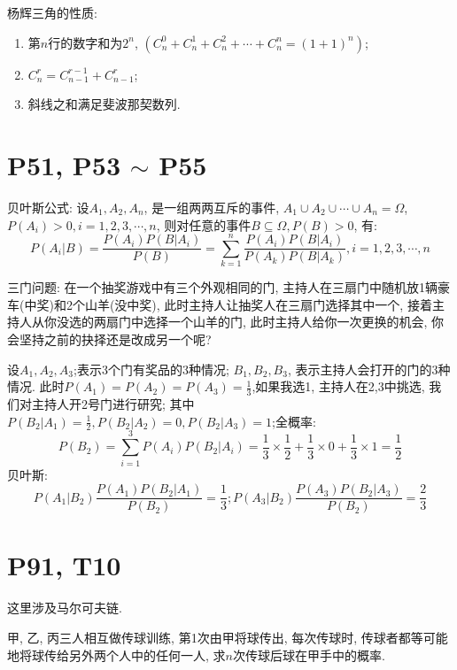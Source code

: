 \documentclass{book}
\begin{document}
    杨辉三角的性质:

    \begin{enumerate}
        \item 第$n$行的数字和为$2^n$, $\left( C_n^0+C_n^1+C_n^2+\cdots+C_n^n=(1+1)^n \right)$;
        \item $C_n^r=C_{n-1}^{r-1}+C_{n-1}^r$;
        \item 斜线之和满足斐波那契数列.
    \end{enumerate}

    \section{\textcolor[rgb]{0.11,0.65,0.52}{P51, P53 $\sim$ P55}}
    贝叶斯公式: 设$A_1,A_2,A_n$, 是一组两两互斥的事件, $A_1\cup A_2\cup \cdots \cup A_n=\Omega$, $P(A_i)>0,i=1,2,3,\cdots,n$, 则对任意的事件$B\subseteq \Omega,P(B)>0$, 有:$$P\left( A_i\Big|B \right)=\frac{P\left( A_i \right)P\left( B\Big|A_i \right)}{P(B)}=\sum_{k=1}^{n} \frac{P(A_i)P(B|A_i)}{P(A_k)P(B \Big |A_k)},i=1,2,3,\cdots,n$$

    \textcolor[rgb]{0.38,0.11,0.2}{三门问题}: 在一个抽奖游戏中有三个外观相同的门, 主持人在三扇门中随机放1辆豪车(中奖)和2个山羊(没中奖), 此时主持人让抽奖人在三扇门选择其中一个, 接着主持人从你没选的两扇门中选择一个山羊的门, 此时主持人给你一次更换的机会, 你会坚持之前的抉择还是改成另一个呢?

    设$A_1,A_2,A_3$;表示3个门有奖品的3种情况; $B_1,B_2,B_3$, 表示主持人会打开的门的3种情况. 此时$\displaystyle P(A_1)=P(A_2)=P(A_3)=\frac{1}{3}$,如果我选1, 主持人在2,3中挑选, 我们对主持人开2号门进行研究; 其中$\displaystyle P\left( B_2\Big|A_1 \right)=\frac{1}{2},P\left( B_2\Big|A_2 \right)=0,P\left( B_2\Big|A_3 \right)=1$;全概率: $$P\left( B_2 \right)=\sum_{i=1}^{3} P(A_i)P\left ( B_2\Big |A_i \right ) =\frac{1}{3}\times \frac{1}{2} +\frac{1}{3}\times 0+\frac{1}{3}\times 1=\frac{1}{2} $$贝叶斯:$$P\left( A_1\Big|B_2 \right)\frac{P(A_1)P\left( B_2\Big|A_1 \right)}{P(B_2)}=\frac{1}{3};P\left( A_3\Big|B_2 \right)\frac{P(A_3)P\left( B_2\Big|A_3 \right)}{P(B_2)}=\frac{2}{3}$$
    \section{\textcolor[rgb]{0.11,0.65,0.52}{P91, T10}}
    这里涉及\textcolor[rgb]{0.38,0.11,0.2}{马尔可夫链}.

    \begin{boxB}
        甲, 乙, 丙三人相互做传球训练, 第1次由甲将球传出, 每次传球时, 传球者都等可能地将球传给另外两个人中的任何一人, 求$n$次传球后球在甲手中的概率.
    \end{boxB}
\end{document}
